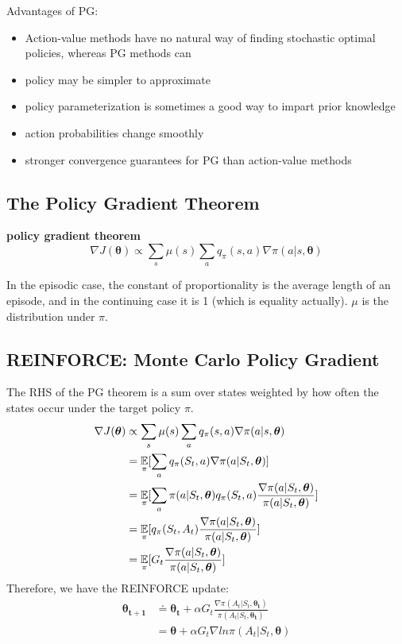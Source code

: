 \documentclass[sutton_barto_notes.tex]{subfiles}
\begin{document}
Advantages of PG:
\begin{itemize}
\item Action-value methods have no natural way of finding stochastic optimal policies, whereas PG methods can
\item policy may be simpler to approximate
\item policy parameterization is sometimes a good way to impart prior knowledge
\item action probabilities change smoothly
\item stronger convergence guarantees for PG than action-value methods
\end{itemize}


\subsection{The Policy Gradient Theorem}

\begin{definition}
\textbf{policy gradient theorem}
$$\nabla J(\bm{\theta}) \propto \sum_s\mu(s)\sum_a q_\pi(s,a)\nabla\pi(a|s,\bm{\theta})$$
\end{definition}
In the episodic case, the constant of proportionality is the average length of an episode, and in the continuing case it is 1 (which is equality actually). $\mu$ is the distribution under $\pi$.

\subsection{REINFORCE: Monte Carlo Policy Gradient}

The RHS of the PG theorem is a sum over states weighted by how often the states occur under the target policy $\pi$.
\begin{align*}
\nabla J(\bm{\theta}) & \propto \sum_s\mu(s)\sum_a q_\pi(s,a)\nabla\pi(a|s,\bm{\theta}) \\
&= \operatorname*{\mathbb{E}}_\pi [\sum_a q_\pi(S_t, a)\nabla\pi(a|S_t, \bm{\theta})] \\
&= \operatorname*{\mathbb{E}}_\pi [\sum_a \pi(a|S_t,\bm{\theta}) q_\pi(S_t, a) \frac{\nabla\pi(a|S_t, \bm{\theta})}{\pi(a|S_t, \bm{\theta})} ] \\
&= \operatorname*{\mathbb{E}}_\pi [q_\pi(S_t, A_t) \frac{\nabla\pi(a|S_t, \bm{\theta})}{\pi(a|S_t, \bm{\theta})}] \\
&= \operatorname*{\mathbb{E}}_\pi [G_t \frac{\nabla\pi(a|S_t, \bm{\theta})}{\pi(a|S_t, \bm{\theta})}]
\end{align*}
Therefore, we have the REINFORCE update:
\begin{align*}
\bm{\theta_{t+1}} &\doteq \bm{\theta_t} + \alpha G_t \frac{\nabla\pi(A_t|S_t,\bm{\theta_t})}{\pi(A_t|S_t,\bm{\theta_t})} \\
&= \bm{\theta} + \alpha G_t \nabla ln \pi(A_t|S_t, \bm{\theta})
\end{align*}
\end{document}
